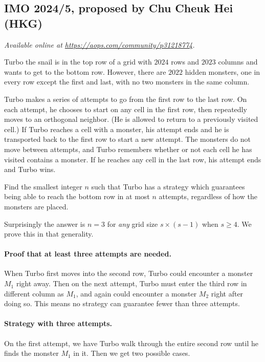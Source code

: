 \documentclass[11pt]{scrartcl}
\begin{document}
\subsection{IMO 2024/5, proposed by Chu Cheuk Hei (HKG)}
\textsl{Available online at \url{https://aops.com/community/p31218774}.}
\begin{mdframed}[style=mdpurplebox,frametitle={Problem statement}]
Turbo the snail is in the top row of a grid with $2024$ rows and $2023$ columns
and wants to get to the bottom row.
However, there are $2022$ hidden monsters, one in every row except the first and last,
with no two monsters in the same column.

Turbo makes a series of attempts to go from the first row to the last row.
On each attempt, he chooses to start on any cell in the first row,
then repeatedly moves to an orthogonal neighbor.
(He is allowed to return to a previously visited cell.)
If Turbo reaches a cell with a monster,
his attempt ends and he is transported back to the first row to start a new attempt.
The monsters do not move between attempts, and Turbo remembers whether or not each cell
he has visited contains a monster.
If he reaches any cell in the last row, his attempt ends and Turbo wins.

Find the smallest integer $n$ such that Turbo has a strategy which guarantees
being able to reach the bottom row in at most $n$ attempts,
regardless of how the monsters are placed.
\end{mdframed}
Surprisingly the answer is $n = 3$ for \emph{any} grid size $s \times (s-1)$ when $s \ge 4$.
We prove this in that generality.

\paragraph{Proof that at least three attempts are needed.}
When Turbo first moves into the second row, Turbo could encounter a monster $M_1$ right away.
Then on the next attempt, Turbo must enter the third row in different column as $M_1$,
and again could encounter a monster $M_2$ right after doing so.
This means no strategy can guarantee fewer than three attempts.

\paragraph{Strategy with three attempts.}
On the first attempt, we have Turbo walk through the entire second row
until he finds the monster $M_1$ in it.
Then we get two possible cases.
\end{document}
